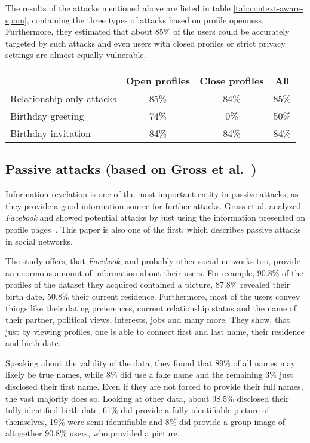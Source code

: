 The results of the attacks mentioned above are listed in table
\ref{tab:context-aware-spam}, containing the three types of attacks based on
profile openness. Furthermore, they estimated that about 85\% of the users
could be accurately targeted by such attacks and even users with closed
profiles or strict privacy settings are almost equally vulnerable.

\begin{table*}[ht]
  \centering
  \begin{tabular}{lccc}
    \toprule
    & Open profiles & Close profiles & All\\
    \midrule
    Relationship-only attacks & 85\% & 84\% & 85\% \\
    Birthday greeting         & 74\% &  0\% & 50\% \\
    Birthday invitation       & 84\% & 84\% & 84\% \\
    \bottomrule
  \end{tabular}
  \caption{Results of the case study of Brown et al.~\cite{brown2008}}
  \label{tab:context-aware-spam}
\end{table*}

\subsection[Passive attacks]{Passive attacks (based on Gross et al.~\cite{gross2005})}

Information revelation is one of the most important entity in passive attacks,
as they provide a good information source for further attacks. Gross et al.
analyzed \textit{Facebook} and showed potential attacks by just using the
information presented on profile pages~\cite{gross2005}. This paper is also one
of the first, which describes passive attacks in social networks.

The study offers, that \textit{Facebook}, and probably other social networks
too, provide an enormous amount of information about their users. For example,
90.8\% of the profiles of the dataset they acquired contained a picture, 87.8\%
revealed their birth date, 50.8\% their current residence. Furthermore, most of
the users convey things like their dating preferences, current relationship
status and the name of their partner, political views, interests, jobs and many
more. They show, that just by viewing profiles, one is able to connect first
and last name, their residence and birth date.

Speaking about the validity of the data, they found that 89\% of all names may
likely be true names, while 8\% did use a fake name and the remaining 3\% just
disclosed their first name. Even if they are not forced to provide their full
names, the vast majority does so. Looking at other data, about 98.5\% disclosed
their fully identified birth date, 61\% did provide a fully identifiable
picture of themselves, 19\% were semi-identifiable and 8\% did provide a group
image of altogether 90.8\% users, who provided a picture.

